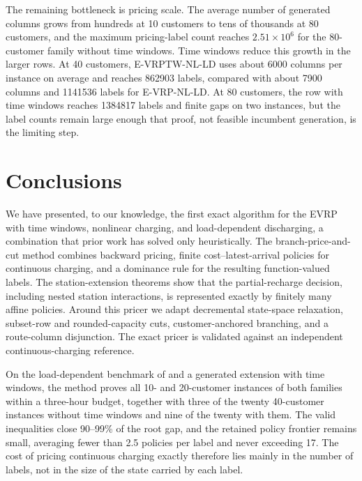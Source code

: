 \documentclass[review,3p,authoryear]{elsarticle}
\theoremstyle{plain}
\theoremstyle{definition}
\theoremstyle{remark}
\begin{document}
The remaining bottleneck is pricing scale. The average number of generated
columns grows from hundreds at 10 customers to tens of thousands at 80 customers,
and the maximum pricing-label count reaches $2.51\times10^6$ for the 80-customer
family without time windows. Time windows reduce this growth in the larger rows. At
40 customers, E-VRPTW-NL-LD uses about 6000 columns per instance on average and
reaches 862903 labels, compared with about 7900 columns and 1141536 labels for
E-VRP-NL-LD. At 80 customers, the row with time windows reaches 1384817 labels and
finite gaps on two instances, but the label counts remain large enough that proof,
not feasible incumbent generation, is the limiting step.

\section{Conclusions}
\label{sec:conclusion}

We have presented, to our knowledge, the first exact algorithm for the EVRP with
time windows, nonlinear charging, and load-dependent discharging, a combination that
prior work has solved only heuristically. The branch-price-and-cut method combines
backward pricing, finite cost--latest-arrival policies for continuous charging, and
a dominance rule for the resulting function-valued labels. The station-extension
theorems show that the partial-recharge decision, including nested station
interactions, is represented exactly by finitely many affine policies. Around this
pricer we adapt decremental state-space relaxation, subset-row and rounded-capacity
cuts, customer-anchored branching, and a route-column disjunction. The exact pricer
is validated against an independent continuous-charging reference.

On the load-dependent benchmark of \citet{KancharlaRamadurai2020} and a generated
extension with time windows, the method proves all 10- and 20-customer instances
of both families within a three-hour budget, together with three of the twenty
40-customer instances without time windows and nine of the twenty with them. The
valid inequalities close 90--99\% of the root gap, and the retained policy frontier remains small,
averaging fewer than 2.5 policies per label and never exceeding 17. The cost of
pricing continuous charging exactly therefore lies mainly in the number of labels,
not in the size of the state carried by each label.


\appendix
\setcounter{table}{0}
\renewcommand{\theHtable}{A.\arabic{table}}
\end{document}
